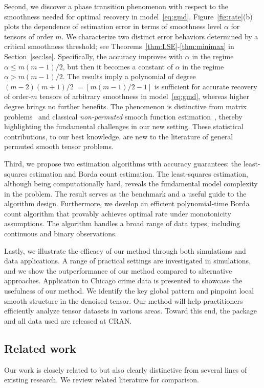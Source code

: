 \documentclass[11pt]{article}
\theoremstyle{definition}
\begin{document}
Second, we discover a phase transition phenomenon with respect to the smoothness needed for optimal recovery in model~\eqref{eq:gmd}. Figure~\ref{fig:rate}(b) plots the dependence of estimation error in terms of smoothness level $\alpha$ for tensors of order $m$. We characterize two distinct error behaviors determined by a critical smoothness threshold; see Theorems~\ref{thm:LSE}-\ref{thm:minimax} in Section~\ref{sec:lse}. Specifically, the accuracy improves with $\alpha$ in the regime $\alpha\leq m(m-1)/2$, but then it becomes a constant of $\alpha$ in the regime $\alpha>m(m-1)/2$. The results imply a polynomial of degree $(m-2)(m+1)/2$ $=[m(m-1)/2-1]$ is sufficient for accurate recovery of order-$m$ tensors of arbitrary smoothness in model~\eqref{eq:gmd}, whereas higher degree brings no further benefits. The phenomenon is distinctive from matrix problems~\citep{klopp2017oracle,gao2015rate} and classical \emph{non-permuted} smooth function estimation~\citep{tsybakov2009introduction}, thereby highlighting the fundamental challenges in our new setting. These statistical contributions, to our best knowledge, are new to the literature of general permuted smooth tensor problems. 

Third, we propose two estimation algorithms with accuracy guarantees: the least-squares estimation and Borda count estimation. The least-squares estimation, although being computationally hard, reveals the fundamental model complexity in the problem. The result serves as the benchmark and a useful guide to the algorithm design. Furthermore, we develop an efficient polynomial-time Borda count algorithm that provably achieves optimal rate under monotonicity assumptions. The algorithm handles a broad range of data types, including continuous and binary observations. 

Lastly, we illustrate the efficacy of our method through both simulations and data applications. A range of practical settings are investigated in simulations, and we show the outperformance of our method compared to alternative approaches.
Application to Chicago crime data is presented to showcase the usefulness of our method. We identify the key global pattern and pinpoint local smooth structure in the denoised tensor. Our method will help practitioners efficiently analyze tensor datasets in various areas. Toward this end, the package and all data used are released at CRAN.

\subsection{Related work}\label{sec:priorwork}
 Our work is closely related to but also clearly distinctive from several lines of existing research. We review related literature for comparison.
\end{document}

